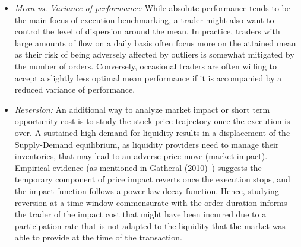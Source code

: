 \begin{itemize}
\item \emph{Mean vs. Variance of performance:} While absolute performance tends to be the main focus of execution benchmarking, a trader might also want to control the level of dispersion around the mean. In practice, traders with large amounts of flow on a daily basis often focus more on the attained mean as their risk of being adversely affected by outliers is somewhat mitigated by the number of orders. Conversely, occasional traders are often willing to accept a slightly less optimal mean performance if it is accompanied by a reduced variance of performance.

\item \emph{Reversion:} An additional way to analyze market impact or short term opportunity cost is to study the stock price trajectory once the execution is over. A sustained high demand for liquidity results in a displacement of the Supply-Demand equilibrium, as liquidity providers need to manage their inventories, that may lead to an adverse price move (market impact). Empirical evidence (as mentioned in Gatheral (2010)~\cite{gatheral}) suggests the temporary component of price impact reverts once the execution stops, and the impact function follows a power law decay function. Hence, studying reversion at a time window commensurate with the order duration informs the trader of the impact cost that might have been incurred due to a participation rate that is not adapted to the liquidity that the market was able to provide at the time of the transaction.



\end{itemize}
